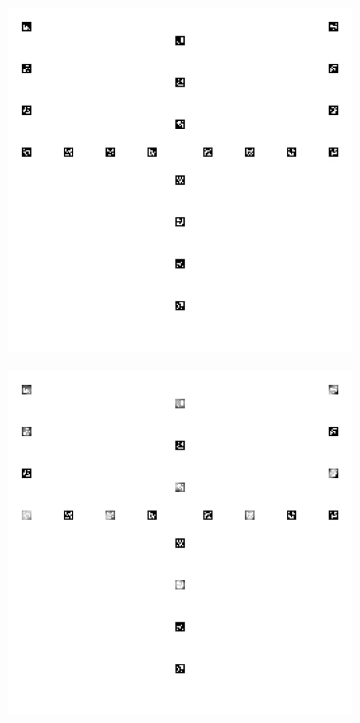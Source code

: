 \documentclass[../Head/report.tex]{subfiles}
\begin{document}
\begin{figure}[H]
\begin{subfigure}[t]{.20\textwidth}
        \caption{}
        \label{fig:gazebo_one_pattern_board}
    \end{subfigure}
     \hspace{0.2em}
    \begin{subfigure}[t]{.20\textwidth}
        \centering
        \includegraphics[width=\textwidth]{../Figures/vision_navigation/grid_board_new_200_big_onepattern_missing_markers1.png}
        \caption{}
        \label{fig:gazebo_one_pattern_board_missing_markers}
    \end{subfigure}
         \hspace{0.2em}
    \begin{subfigure}[t]{.20\textwidth}
        \centering
        \includegraphics[width=\textwidth]{../Figures/vision_navigation/grid_board_new_200_big_onepattern_missing_markers_wear.png}

\end{subfigure}
\end{figure}
\end{document}

